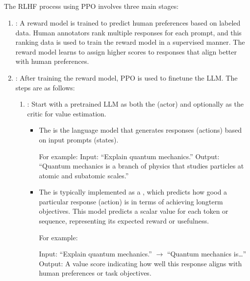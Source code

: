 \documentclass[letterpaper,11pt,english]{sphinxmanual}
\begin{document}
\subsection{}
\label{\detokenize{rlhf:steps-of-rlhf-using-ppo}}
\sphinxAtStartPar
The RLHF process using PPO involves three main stages:
\begin{enumerate}
%
\item {} 
\sphinxAtStartPar
{}: A reward model is trained to predict
human preferences based on labeled data. Human annotators rank
multiple responses for each prompt, and this ranking data is used to
train the reward model in a supervised manner. The reward model
learns to assign higher scores to responses that align better with
human preferences.

\item {} 
\sphinxAtStartPar
{}: After training the reward model,
PPO is used to fine\sphinxhyphen{}tune the LLM. The steps are as follows:
\begin{enumerate}
%
\item {} 
\sphinxAtStartPar
{}: Start with a pre\sphinxhyphen{}trained LLM as both the
 (actor) and optionally as the critic for value
estimation.
\begin{itemize}
\item {} 
\sphinxAtStartPar
The  is the language model that generates responses
(actions) based on input prompts (states).

\sphinxAtStartPar
For example: Input: “Explain quantum mechanics.” Output:
“Quantum mechanics is a branch of physics that studies particles
at atomic and subatomic scales.”

\item {} 
\sphinxAtStartPar
The  is typically implemented as a ,
which predicts how good a particular response (action) is in
terms of achieving long\sphinxhyphen{}term objectives. This model predicts a
scalar value for each token or sequence, representing its
expected reward or usefulness.

\sphinxAtStartPar
For example:

\sphinxAtStartPar
Input: “Explain quantum mechanics.” \(\rightarrow\) “Quantum mechanics is…”
Output: A value score indicating how well this response aligns
with human preferences or task objectives.


\end{itemize}
\end{enumerate}
\end{enumerate}
\end{document}
